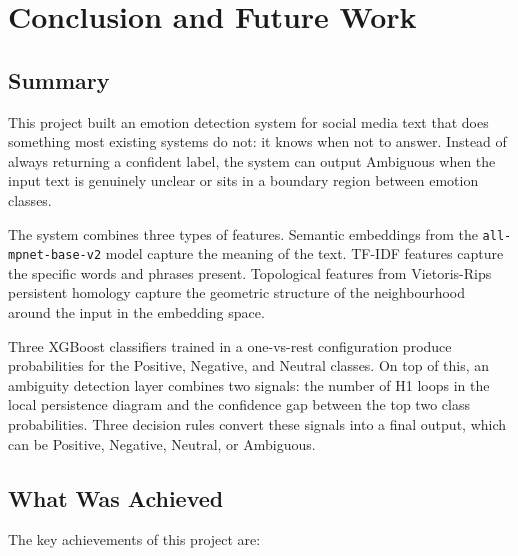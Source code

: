 \chapter{Conclusion and Future Work}

\section{Summary}

This project built an emotion detection system for social media text that does something most
existing systems do not: it knows when not to answer. Instead of always returning a confident
label, the system can output Ambiguous when the input text is genuinely unclear or sits in a
boundary region between emotion classes.

The system combines three types of features. Semantic embeddings from the
\texttt{all-mpnet-base-v2} model capture the meaning of the text. TF-IDF features capture the
specific words and phrases present. Topological features from Vietoris-Rips persistent homology
capture the geometric structure of the neighbourhood around the input in the embedding space.

Three XGBoost classifiers trained in a one-vs-rest configuration produce probabilities for the
Positive, Negative, and Neutral classes. On top of this, an ambiguity detection layer combines
two signals: the number of H1 loops in the local persistence diagram and the confidence gap
between the top two class probabilities. Three decision rules convert these signals into a final
output, which can be Positive, Negative, Neutral, or Ambiguous.

\section{What Was Achieved}

The key achievements of this project are:


